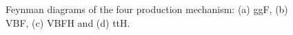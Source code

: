 \begin{figure}[htbp]
    \centering
     \quad
     \quad
     \quad
     \quad
    \caption{Feynman diagrams of the four production mechanism:
    (a) ggF, (b) VBF, (c) VBFH and (d) ttH. }
    \label{fig:SM:production}
\end{figure}

